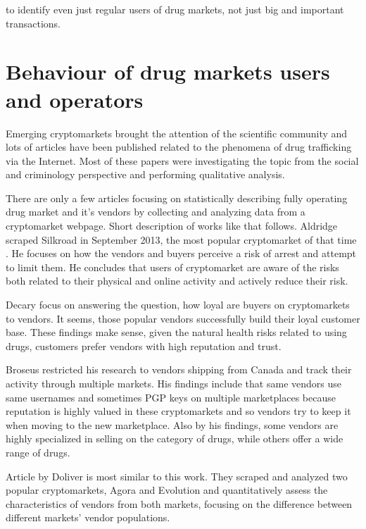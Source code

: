 \documentclass[
  digital, %
  table,   %
  lof,     %
  lot,     %
  oneside
]{fithesis3}
\begin{document}
to identify even just regular users of drug markets, not just big and important transactions.

\section{Behaviour of drug markets users and operators}

Emerging cryptomarkets brought the attention of the scientific community
and lots of articles have been published related to the phenomena of drug trafficking via the Internet.
Most of these papers were investigating the topic from the social
and criminology perspective and performing qualitative analysis.
\parencite{aldridge2014not}
\parencite{barratt2014use}
\parencite{christin2013traveling}
\parencite{dolliver2015criminogenic}
\parencite{van2013silk}
\parencite{walsh2011drugs}
\parencite{martin2014lost}

There are only a few articles focusing on statistically describing fully operating drug market and it's vendors
by collecting and analyzing data from a cryptomarket webpage. Short description of works like that follows.
Aldridge \parencite{aldridge2017delivery} scraped Silkroad in September 2013, the most popular cryptomarket of that time
.
He focuses on how the vendors and buyers perceive a risk of arrest and attempt to limit them.
He concludes that users of cryptomarket are aware of the risks both related to their physical and online activity
and actively reduce their risk.

Decary \parencite{decary2017repeat} focus on answering the question, how loyal are buyers on cryptomarkets to vendors. It seems, those popular vendors successfully build their loyal
customer base. These findings make sense, given the natural health risks related to using drugs,
customers prefer vendors with high reputation and trust.

Broseus \parencite{broseus2016studying} restricted his research to vendors shipping from Canada
and track their activity through multiple markets. His findings include that same vendors
use same usernames and sometimes PGP keys on multiple marketplaces because reputation
is highly valued in these cryptomarkets and so vendors try to keep it when moving to the new marketplace.
Also by his findings, some vendors are highly specialized in selling on the category of drugs, while others offer a wide range of drugs.

Article by Doliver \parencite{dolliver2016characteristics} is most similar to this work.
They scraped and analyzed two popular cryptomarkets, Agora and Evolution and quantitatively assess
the characteristics of vendors from both markets, focusing on the difference
 between different markets' vendor populations.
\end{document}
